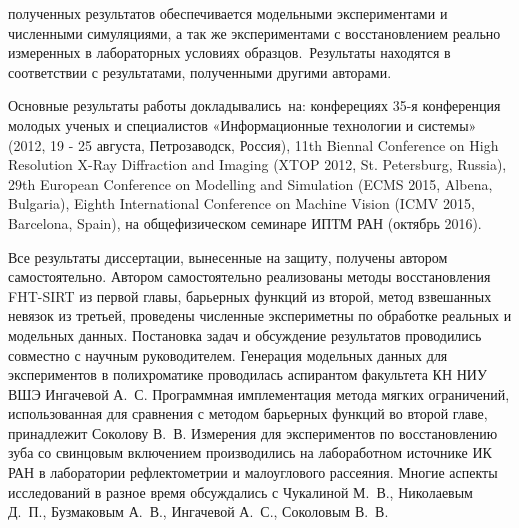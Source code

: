 {\reliability} полученных результатов обеспечивается модельными экспериментами и численными симуляциями, а так же экспериментами с восстановлением реально измеренных в лабораторных условиях образцов.\ Результаты находятся в соответствии с результатами, полученными другими авторами.


{\probation}
Основные результаты работы докладывались~на: конферециях 
35-я конференция молодых ученых и специалистов «Информационные технологии и системы» (2012, 19 - 25 августа, Петрозаводск, Россия),
11th Biennal Conference on High Resolution X-Ray Diffraction and Imaging (XTOP 2012, St. Petersburg, Russia), 
29th European Conference on Modelling and Simulation (ECMS 2015, Albena, Bulgaria),
Eighth International Conference on Machine Vision (ICMV 2015, Barcelona, Spain),
на общефизическом семинаре ИПТМ РАН (октябрь 2016).

{\contribution} Все результаты диссертации, вынесенные на защиту, получены автором самостоятельно.
Автором самостоятельно реализованы методы восстановления FHT-SIRT из первой главы, барьерных функций из второй, метод взвешанных невязок из третьей, проведены численные экспериметны по обработке реальных и модельных данных.
Постановка задач и обсуждение результатов проводились совместно с научным руководителем.
Генерация модельных данных для экспериментов в полихроматике проводилась аспирантом факультета КН НИУ ВШЭ Ингачевой А.~С. 
Программная имплементация метода мягких ограничений, использованная для сравнения с методом барьерных функций во второй главе, принадлежит Соколову В.~В.
Измерения для экспериментов по восстановлению зуба со свинцовым включением производились на лабоработном источнике ИК РАН в лаборатории рефлектометрии и малоуглового рассеяния.
Многие аспекты исследований в разное время обсуждались с Чукалиной М.~В., Николаевым Д.~П., Бузмаковым А.~В., Ингачевой А.~С., Соколовым В.~В.


